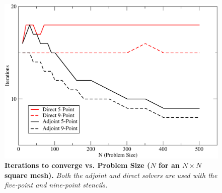 \begin{figure}[t!]
  \centering
  \includegraphics[width=5in,clip]{chapters/mc_background/dir_adj_iterations.pdf}
  \caption{\textbf{Iterations to converge vs. Problem Size ($N$ for an
      $N \times N$ square mesh).} \textit{Both the adjoint and direct
      solvers are used with the five-point and nine-point stencils.}}
  \label{fig:poisson_iterations}
\end{figure}

